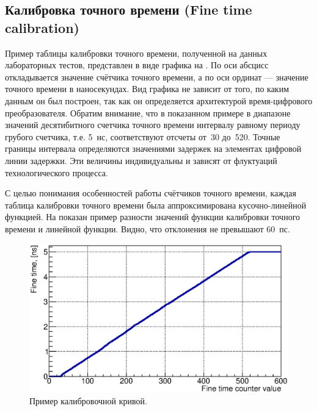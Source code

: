 \subsection{Калибровка точного времени (Fine time calibration)}\label{section:FTcalib}

Пример таблицы калибровки точного времени, полученной на данных лабораторных тестов, представлен в виде графика на . По оси абсцисс откладывается значение счётчика точного времени, а по оси ординат --- значение точного времени в наносекундах. Вид графика не зависит от того, по каким данным он был построен, так как он определяется архитектурой время-цифрового преобразователя. Обратим внимание, что в показанном примере в диапазоне значений десятибитного счетчика точного времени интервалу равному периоду грубого счетчика, т.е. 5~нс, соответствуют отсчеты от~30 до~520. Точные границы интервала определяются значениями задержек на элементах цифровой линии задержки. Эти величины индивидуальны и зависят от флуктуаций технологического процесса.

С целью понимания особенностей работы счётчиков точного времени, каждая таблица калибровки точного времени была аппроксимирована кусочно-линейной функцией. На  показан пример разности значений функции калибровки точного времени и линейной функции. Видно, что отклонения не превышают 60~пс.

\begin{figure}[H]
\centering
\includegraphics[width=1.0\textwidth]{pictures/17_CalTable_0010_01_feb2017.eps}
\caption{Пример калибровочной кривой.}
\label{fig:TypicalCalibTable}
\end{figure}

